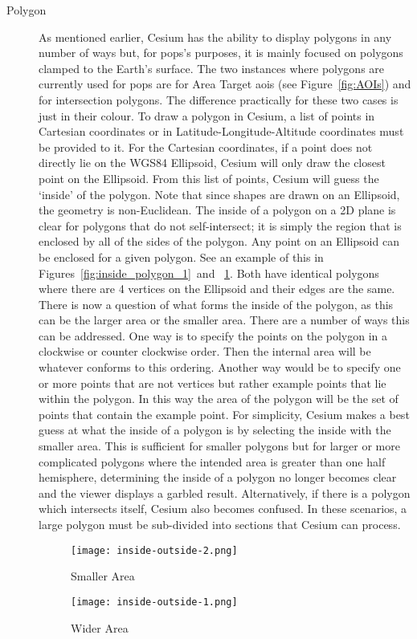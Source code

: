\begin{description}
    \item[Polygon] As mentioned earlier, Cesium has the ability to display
	polygons in any number of ways but, for \gls{pops}'s purposes, it is
	mainly focused on polygons clamped to the Earth's surface. The two
	instances where polygons are currently used for \gls{pops} are for Area
	Target \glspl{aoi} (see Figure~\ref{fig:AOIs}) and for intersection
	polygons.  The difference practically for these two cases is just in
	their colour.  To draw a polygon in Cesium, a list of points in
	Cartesian coordinates or in Latitude-Longitude-Altitude coordinates
	must be provided to it.  For the Cartesian coordinates, if a point does
	not directly lie on the WGS84 Ellipsoid, Cesium will only draw the
	closest point on the Ellipsoid.  From this list of points, Cesium will
	guess the `inside' of the polygon. Note that since shapes are drawn on
	an Ellipsoid, the geometry is non-Euclidean. The inside of a polygon on
	a 2D plane is clear for polygons that do not self-intersect; it is
	simply the region that is enclosed by all of the sides of the polygon.
	Any point on an Ellipsoid can be enclosed for a given polygon.  See an
	example of this in Figures~\ref{fig:inside_polygon_1}~and~
	\ref{fig:inside_polygon_2}.  Both have identical polygons where there
	are 4 vertices on the Ellipsoid and their edges are the same.  There is
	now a question of what forms the inside of the polygon, as this can be
	the larger area or the smaller area. There are a number of ways this
	can be addressed.  One way is to specify the points on the polygon in a
	clockwise or counter clockwise order. Then the internal area will be
	whatever conforms to this ordering. Another way would be to specify one
	or more points that are not vertices but rather example points that lie
	within the polygon. In this way the area of the polygon will be the set
	of points that contain the example point. For simplicity, Cesium makes
	a best guess at what the inside of a polygon is by selecting the inside
	with the smaller area. This is sufficient for smaller polygons but for
	larger or more complicated polygons where the intended area is greater
	than one half hemisphere, determining the inside of a polygon no longer
	becomes clear and the viewer displays a garbled result.  Alternatively,
	if there is a polygon which intersects itself, Cesium also becomes
	confused. In these scenarios, a large polygon must be sub-divided into
	sections that Cesium can process.

\begin{figure}
    \begin{minipage}[c]{0.45\textwidth}
	\centering
	\texttt{[image: inside-outside-2.png]} 
	\caption{Smaller Area}
	\label{fig:inside_polygon_1}
    \end{minipage}
    \hfill
    \begin{minipage}[c]{0.45\textwidth}
	\centering
	\texttt{[image: inside-outside-1.png]} 
	\caption{Wider Area}
	\label{fig:inside_polygon_2}
    \end{minipage} 
\end{figure}




\end{description}
